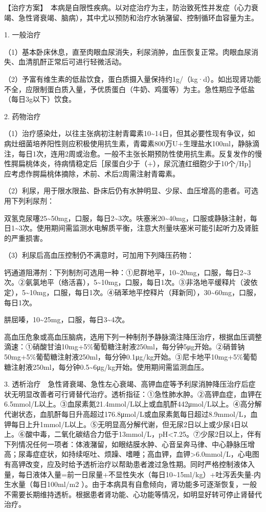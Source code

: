 【治疗方案】　本病是自限性疾病。以对症治疗为主，防治致死性并发症（心力衰竭、急性肾衰竭、脑病），其中尤以预防和治疗水钠潴留、控制循环血容量为主。

1. 一般治疗

（1）基本卧床休息，直至肉眼血尿消失，利尿消肿，血压恢复正常。肉眼血尿消失、血清肌酐正常后可进行轻微活动。

（2）予富有维生素的低盐饮食，蛋白质摄入量保持约1g/（kg·d）。如出现肾功能不全，应限制蛋白质入量，予优质蛋白（牛奶、鸡蛋等）为主。急性期应予低盐（每日3g以下）饮食。

2. 药物治疗

（1）治疗感染灶，以往主张病初注射青霉素10\textasciitilde{}14日，但其必要性现有争议，如病灶细菌培养阳性则应积极使用抗生素，青霉素800万U+生理盐水100ml，静脉滴注，每日1次，连用2周或治愈。一般不主张长期预防性使用抗生素。反复发作的慢性腭扁桃体炎，待病情稳定后［尿蛋白少于（+），尿沉渣红细胞少于10个/Hp］应考虑作腭扁桃体摘除，术前、术后2周需注射青霉素。

（2）利尿，用于限水限盐、卧床后仍有水肿明显、少尿、血压增高的患者。可选用下列利尿剂：

双氢克尿噻25\textasciitilde{}50mg，口服，每日2\textasciitilde{}3次。呋塞米20\textasciitilde{}40mg，口服或静脉注射，每日1\textasciitilde{}3次。使用期间需监测水电解质平衡，注意大剂量呋塞米可能引起听力及肾脏的严重损害。

（3）利尿后高血压控制仍不满意时，可加用下列降压药物：

钙通道阻滞剂：下列制剂可选用一种：①尼群地平，10\textasciitilde{}20mg，口服，每日2\textasciitilde{}3次。②氨氯地平（络活喜），5\textasciitilde{}10mg，口服，每日1次。③非洛地平缓释片（波依定），5\textasciitilde{}10mg，口服，每日1次。④硝苯地平控释片（拜新同），30\textasciitilde{}60mg，口服，每日1次。

肼屈嗪，10\textasciitilde{}25mg，口服，每日3\textasciitilde{}4次。

高血压危象或高血压脑病，选用下列一种制剂予静脉滴注降压治疗，根据血压调整滴速：①硝酸甘油10mg+5\%葡萄糖注射液250ml，每分钟5μg开始。②硝普钠50mg+5\%葡萄糖注射液250ml，每分钟0.1μg/kg开始。③尼卡地平10mg+5\%葡萄糖注射液250ml，每分钟0.5\textasciitilde{}6μg/kg开始。使用期间需监测血压。

3.
透析治疗　急性肾衰竭、急性左心衰竭、高钾血症等予利尿消肿降压治疗后症状无明显改善者可行肾替代治疗。透析指征：①急性肺水肿。②高钾血症，血钾在6.5mmol/L以上。③血尿素氮21.4mmol/L以上或血肌酐442μmol/L以上。④高分解代谢状态，血肌酐每日升高超过176.8μmol/L或血尿素氮每日超过8.9mmol/L，血钾每日上升1mmol/L以上。⑤无明显高分解代谢，但无尿2日以上或少尿4日以上。⑥酸中毒，二氧化碳结合力低于13mmol/L，pH\textless{}7.25。⑦少尿2日以上，伴有下列情况任何一项者：体液潴留，如眼结膜水肿、心音呈奔马律、中心静脉压增高；尿毒症症状，如持续呕吐、烦躁、嗜睡；高血钾，血钾\textgreater{}6.0mmol/L，心电图有高钾改变，应及时给予透析治疗以帮助患者渡过急性期。同时严格控制液体入量，每日液体入量=前一日尿量+不显性失水（每日10\textasciitilde{}15ml/kg）+吐泻丢失量-内生水量（每日100ml/m{2}
）。由于本病具有自愈倾向，肾功能多可逐渐恢复，一般不需要长期维持透析。根据患者肾功能、心功能等情况，如明显好转可停止肾替代治疗。

